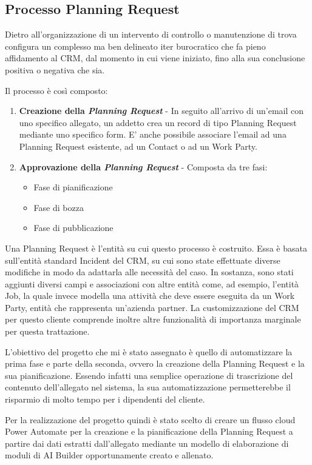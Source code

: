 \subsection{Processo Planning Request}
Dietro all'organizzazione di un intervento di controllo o manutenzione di trova configura un complesso ma ben delineato iter burocratico che fa pieno affidamento al CRM, dal momento in cui viene iniziato, fino alla sua conclusione positiva o negativa che sia.

Il processo è così composto:
\begin{enumerate}
  \item \textbf{Creazione della \textit{Planning Request}} - In seguito all'arrivo di un'email con uno specifico allegato, un addetto crea un record di tipo Planning Request mediante uno specifico form. E' anche possibile associare l'email ad una Planning Request esistente, ad un Contact o ad un Work Party. 
  \item \textbf{Approvazione della \textit{Planning Request}} - Composta da tre fasi:
  \begin{itemize} 
          \item Fase di pianificazione
          \item Fase di bozza
          \item Fase di pubblicazione
  \end{itemize}
\end{enumerate}

Una Planning Request è l'entità su cui questo processo è costruito. Essa è basata sull'entità standard Incident del CRM, su cui sono state effettuate diverse modifiche in modo da adattarla alle necessità del caso. In sostanza, sono stati aggiunti diversi campi e associazioni con altre entità come, ad esempio, l'entità Job, la quale invece modella una attività che deve essere eseguita da un Work Party, entità che rappresenta un'azienda partner.
La customizzazione del CRM per questo cliente comprende inoltre altre funzionalità di importanza marginale per questa trattazione.

L'obiettivo del progetto che mi è stato assegnato è quello di automatizzare la prima fase e parte della seconda, ovvero la creazione della Planning Request e la sua pianificazione. Essendo infatti una semplice operazione di trascrizione del contenuto dell'allegato nel sistema, la sua automatizzazione permetterebbe il risparmio di molto tempo per i dipendenti del cliente.

Per la realizzazione del progetto quindi è stato scelto di creare un flusso cloud Power Automate per la creazione e la pianificazione della Planning Request a partire dai dati estratti dall'allegato mediante un modello di elaborazione di moduli di AI Builder opportunamente creato e allenato.

